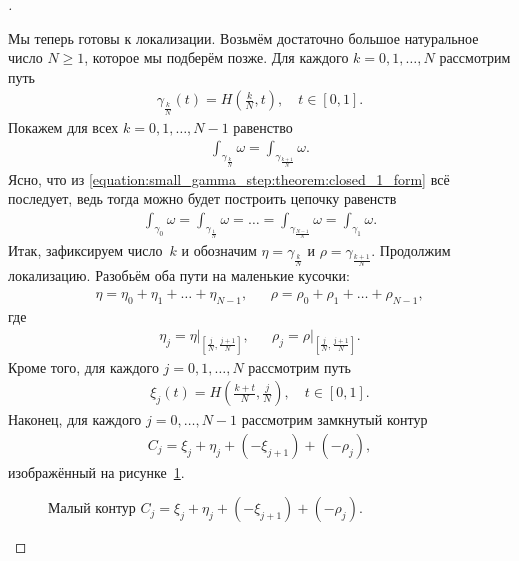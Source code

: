 \documentclass[../complex-analysis.tex]{subfiles}
\begin{document}
\begin{proof}[]
\begin{itemize}
   Мы теперь готовы к локализации. Возьмём достаточно большое натуральное число $ N \geqslant 1 $, которое мы подберём позже. Для каждого $ k = 0, 1, \ldots, N $ рассмотрим путь
   \begin{align*}
    \gamma_{\frac{k}{N}}(t) = H\left(\frac{k}{N}, t\right), \quad t \in [0,1].
   \end{align*} Покажем для всех $ k = 0,1,\ldots,N-1 $ равенство
   \begin{align}
    \label{equation:small_gamma_step:theorem:closed_1_form}
    \int_{\gamma_{\frac{k}{N}}}  \omega = \int_{\gamma_{\frac{k+1}{N}}}  \omega.
   \end{align} Ясно, что из \eqref{equation:small_gamma_step:theorem:closed_1_form} всё последует, ведь тогда можно будет построить цепочку равенств
   \begin{align*}
    \int_{\gamma_0}\omega = \int_{\gamma_{\frac{1}{N}}} \omega = \ldots = \int_{\gamma_{\frac{N-1}{N}}} \omega  = \int_{\gamma_{1}}\omega.
   \end{align*} Итак, зафиксируем число~$k$ и обозначим $\eta = \gamma_{\frac{k}{N}}$  и $\rho = \gamma_{\frac{k+1}{N}}$. Продолжим локализацию. Разобьём оба пути на маленькие кусочки:
   \begin{align*}
    \eta = \eta_0 + \eta_1 + \ldots + \eta_{N-1}, & &\rho = \rho_0 + \rho_1 + \ldots + \rho_{N-1},
   \end{align*} где
   \begin{align*}
    \eta_j = \eta \rvert_{\left[\frac{j}{N},\frac{j+1}{N}\right]  }, & &\rho_j = \rho \rvert_{\left[\frac{j}{N},\frac{j+1}{N}\right]  }.
   \end{align*} Кроме того, для каждого $ j = 0,1,\ldots,N $ рассмотрим путь
   \begin{align*}
    \xi_j(t) = H \left( \frac{k + t}{N}, \frac{j}{N} \right), \quad t \in [0,1].
   \end{align*} Наконец, для каждого $ j = 0,\ldots,N-1 $ рассмотрим замкнутый контур
   \begin{align*}
    C_j = \xi_j+\eta_j+(-\xi_{j+1})+(-\rho_j),
   \end{align*} изображённый на рисунке~\ref{fig:closed_1_form_small_contur}.

   \begin{figure}[ht]
    \centering
    \caption{Малый контур $C_j = \xi_j+\eta_j + (-\xi_{j+1}) + (-\rho_j)$.}
    \label{fig:closed_1_form_small_contur}
   \end{figure}


\end{itemize}
\end{proof}
\end{document}
